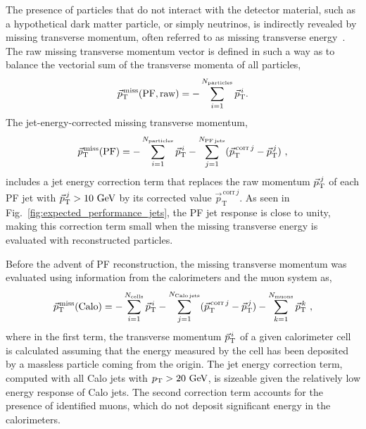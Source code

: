 The presence of particles that do not interact with the detector
material, such as a hypothetical dark matter particle, or simply
neutrinos, is indirectly revealed by missing transverse momentum,
often referred to as missing transverse energy~\cite{Khachatryan:2014gga}. The raw missing transverse momentum
vector is defined in such a way as to balance the vectorial sum of the
transverse momenta of all particles,
\begin{equation}
  {\vec p}_{\mathrm{T}}^{\kern1pt\text{miss}} ({\mathrm{PF, raw}}) = - \sum_{i=1}^{N_{\mathrm{particles}}} {\vec p}_{\mathrm{T}}^{\,i}.
\end{equation}
The jet-energy-corrected missing transverse momentum,
\begin{equation}
  {\vec p}_{\mathrm{T}}^{\kern1pt\text{miss}} ({\mathrm{PF}}) = - \sum_{i=1}^{N_{\mathrm{particles}}}
  {\vec p}_{\mathrm{T}}^{\,i} - \sum_{j=1}^{N_{\mathrm{PF\,jets}}} ({\vec p^{\,\mathrm{corr}\,j}_{\mathrm T}} - {\vec p}_{\mathrm{T}}^{\,j})~,
\end{equation}
includes a jet energy correction term that replaces the raw momentum
${\vec p}_{\mathrm{T}}^{\,j}$  of each PF jet with ${\vec p}_{\mathrm{T}}^{\,j} >10\,\,\text{Ge\hspace{-.08em}V}$ by its
corrected value $\vec p^{\,\mathrm{corr}\,j}_{{\mathrm T}}$.
As seen in Fig.~\ref{fig:expected_performance_jets}, the
PF jet response is close to unity, making this correction term small
when the missing transverse energy is evaluated with reconstructed
particles.

Before the advent of PF reconstruction, the missing transverse
momentum was evaluated using information from the calorimeters and the
muon system as,
\begin{equation}
  {\vec p}_{\mathrm{T}}^{\kern1pt\text{miss}} ({\mathrm{Calo}}) = - \sum_{i=1}^{N_{\mathrm{cells}}}
  {\vec p}_{\mathrm{T}}^{\,i} - \sum_{j=1}^{N_{\mathrm{Calo\,jets}}} ({\vec p^{\,\mathrm{corr}\,j}_{\mathrm T}} - {\vec p}_{\mathrm{T}}^{\,j}) - \sum_{k=1}^{N_{\mathrm{muons}}} {\vec p}_{\mathrm{T}}^{\,k}~,
\end{equation}
where in the first term, the transverse momentum ${\vec p}_{\mathrm{T}}^{\,i}$ of a
given calorimeter cell is calculated assuming that the energy
measured by the cell has been deposited by a massless particle coming
from the origin. The jet energy correction term, computed with all
Calo jets with $p_{\mathrm{T}}>20\,\,\text{Ge\hspace{-.08em}V}$, is sizeable given the relatively low energy response
of Calo jets. The second correction term accounts for the presence of
identified muons, which do not deposit significant energy in the calorimeters.

